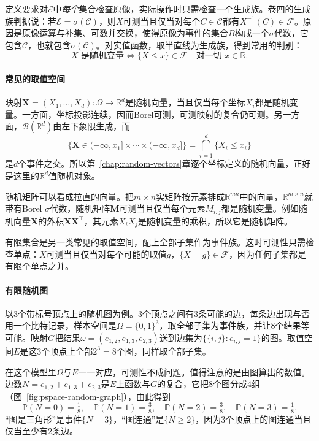 定义要求对$\mathcal{E}$中\emph{每个}集合检查原像，实际操作时只需检查一个生成族。卷四的生成族判据说：若$\mathcal{E}=\sigma(\mathcal{C})$，则$X$可测当且仅当对每个$C\in\mathcal{C}$都有$X^{-1}(C)\in\mathcal{F}$。原因是原像运算与补集、可数并交换，使得原像为事件的集合$B$构成一个$\sigma$代数，它包含$\mathcal{C}$，也就包含$\sigma(\mathcal{C})$。对实值函数，取半直线为生成族，得到常用的判别：
\begin{equation}
  X\text{ 是随机变量}\iff\{X\leq x\}\in\mathcal{F}\quad\text{对一切 }x\in\mathbb{R}.
  \label{eq:pspace-rv-criterion}
\end{equation}

\paragraph{常见的取值空间}
映射$\bm{X}=(X_1,\dots,X_d):\Omega\to\mathbb{R}^{d}$是随机向量，当且仅当每个坐标$X_i$都是随机变量。一方面，坐标投影连续，因而Borel可测，可测映射的复合仍可测。另一方面，$\mathcal{B}(\mathbb{R}^{d})$由左下象限生成，而
\[
  \{\bm{X}\in(-\infty,x_1]\times\cdots\times(-\infty,x_d]\}=\bigcap_{i=1}^{d}\{X_i\leq x_i\}
\]
是$d$个事件之交。所以第~\ref{chap:random-vectors}章逐个坐标定义的随机向量，正好是这里的$\mathbb{R}^{d}$值随机对象。

随机矩阵可以看成拉直的向量。把$m\times n$实矩阵按元素排成$\mathbb{R}^{mn}$中的向量，$\mathbb{R}^{m\times n}$就带有Borel $\sigma$代数，随机矩阵$\bm{M}$可测当且仅当每个元素$M_{i,j}$都是随机变量。例如随机向量$\bm{X}$的外积$\bm{X}\bm{X}^{\top}$，其元素$X_iX_j$是随机变量的乘积，所以它是随机矩阵。

有限集合是另一类常见的取值空间，配上全部子集作为事件族。这时可测性只需检查单点：$X$可测当且仅当对每个可能的取值$g$，$\{X=g\}\in\mathcal{F}$，因为任何子集都是有限个单点之并。

\paragraph{有限随机图}
以$3$个带标号顶点上的随机图为例。$3$个顶点之间有$3$条可能的边，每条边出现与否用一个比特记录，样本空间是$\Omega=\{0,1\}^{3}$，取全部子集为事件族，并让$8$个结果等可能。映射$G$把结果$\omega=(e_{1,2},e_{1,3},e_{2,3})$送到边集为$\{\{i,j\}:e_{i,j}=1\}$的图。取值空间$E$是这$3$个顶点上全部$2^{3}=8$个图，同样取全部子集。

在这个模型里$\Omega$与$E$一一对应，可测性不成问题。值得注意的是由图算出的数值。边数$N=e_{1,2}+e_{1,3}+e_{2,3}$是$E$上函数与$G$的复合，它把$8$个图分成$4$组（图~\ref{fig:pspace-random-graph}），由此得到
\[
  \mathbb{P}(N=0)=\tfrac18,\quad \mathbb{P}(N=1)=\tfrac38,\quad \mathbb{P}(N=2)=\tfrac38,\quad \mathbb{P}(N=3)=\tfrac18 .
\]
“图是三角形”是事件$\{N=3\}$，“图连通”是$\{N\geq2\}$，因为$3$个顶点上的图连通当且仅当至少有$2$条边。

